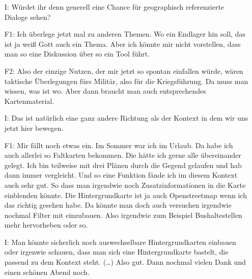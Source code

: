 \begin{itemize}
    \item[I:] Würdet ihr denn generell eine Chance für geographisch referenzierte Dialoge sehen?
    \item[F1:] Ich überlege jetzt mal zu anderen Themen. Wo ein Endlager hin soll, das ist ja weiß Gott auch ein Thema. Aber ich könnte mir nicht vorstellen, dass man so eine Diskussion über so ein Tool führt.
    \item[F2:] Also der einzige Nutzen, der mir jetzt so spontan einfallen würde, wären taktische {\"U}berlegungen fürs Militär, also für die Kriegsführung. Da muss man wissen, was ist wo. Aber dann braucht man auch entsprechendes Kartenmaterial.
    \item[I:] Das ist natürlich eine ganz andere Richtung als der Kontext in dem wir uns jetzt hier bewegen.
    \item[F1:] Mir fällt noch etwas ein. Im Sommer war ich im Urlaub. Da habe ich auch allerlei so Faltkarten bekommen. Die hätte ich gerne alle übereinander gelegt. Ich bin teilweise mit drei Plänen durch die Gegend gelaufen und hab dann immer vergleicht. Und so eine Funktion fände ich im diesem Kontext auch sehr gut. So dass man irgendwie noch Zusatzinformationen in die Karte einblenden könnte. Die Hintergrundkarte ist ja auch Openstreetmap wenn ich das richtig gesehen habe. Da könnte man doch auch versuchen irgendwie nochmal Filter mit einzubauen. Also irgendwie zum Beispiel Bushaltestellen mehr hervorheben oder so.
    \item[I:] Man könnte sicherlich noch auswechselbare Hintergrundkarten einbauen oder irgenwie schauen, dass man sich eine Hintergrundkarte bastelt, die passend zu dem Kontext steht. (\dots) Also gut. Dann nochmal vielen Dank und einen schönen Abend noch.
\end{itemize}